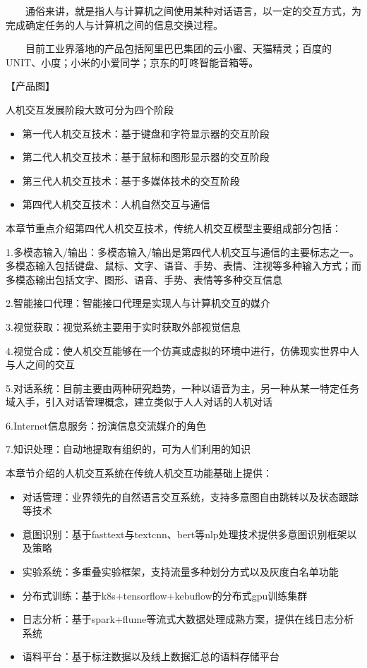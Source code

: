   通俗来讲，就是指人与计算机之间使用某种对话语言，以一定的交互方式，为完成确定任务的人与计算机之间的信息交换过程。

  目前工业界落地的产品包括阿里巴巴集团的云小蜜、天猫精灵；百度的UNIT、小度；小米的小爱同学；京东的叮咚智能音箱等。

【产品图】

人机交互发展阶段大致可分为四个阶段

\begin{itemize}
\item
  第一代人机交互技术：基于键盘和字符显示器的交互阶段
\item
  第二代人机交互技术：基于鼠标和图形显示器的交互阶段
\item
  第三代人机交互技术：基于多媒体技术的交互阶段
\item
  第四代人机交互技术：人机自然交互与通信
\end{itemize}

本章节重点介绍第四代人机交互技术，传统人机交互模型主要组成部分包括：

1.多模态输入/输出：多模态输入/输出是第四代人机交互与通信的主要标志之一。多模态输入包括键盘、鼠标、文字、语音、手势、表情、注视等多种输入方式；而多模态输出包括文字、图形、语音、手势、表情等多种交互信息

2.智能接口代理：智能接口代理是实现人与计算机交互的媒介

3.视觉获取：视觉系统主要用于实时获取外部视觉信息

4.视觉合成：使人机交互能够在一个仿真或虚拟的环境中进行，仿佛现实世界中人与人之间的交互

5.对话系统：目前主要由两种研究趋势，一种以语音为主，另一种从某一特定任务域入手，引入对话管理概念，建立类似于人人对话的人机对话

6.Internet信息服务：扮演信息交流媒介的角色

7.知识处理：自动地提取有组织的，可为人们利用的知识

本章节介绍的人机交互系统在传统人机交互功能基础上提供：

\begin{itemize}
\item
  对话管理：业界领先的自然语言交互系统，支持多意图自由跳转以及状态跟踪等技术
\item
  意图识别：基于fasttext与textcnn、bert等nlp处理技术提供多意图识别框架以及策略
\item
  实验系统：多重叠实验框架，支持流量多种划分方式以及灰度白名单功能
\item
  分布式训练：基于k8s+tensorflow+kebuflow的分布式gpu训练集群
\item
  日志分析：基于spark+flume等流式大数据处理成熟方案，提供在线日志分析系统
\item
  语料平台：基于标注数据以及线上数据汇总的语料存储平台
\end{itemize}

